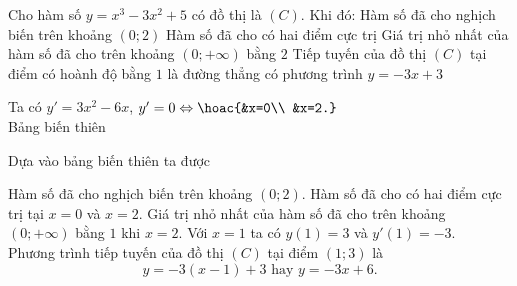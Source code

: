 \begin{ex}%
	Cho hàm số $y=x^3-3x^2+5$ có đồ thị là $(C)$. Khi đó:
	\choiceTF
	{\True Hàm số đã cho nghịch biến trên khoảng $(0;2)$}
	{\True Hàm số đã cho có hai điểm cực trị}
	{Giá trị nhỏ nhất của hàm số đã cho trên khoảng $(0;+\infty)$ bằng $2$}
	{Tiếp tuyến của đồ thị $(C)$ tại điểm có hoành độ bằng $1$ là đường thẳng có phương trình $y=-3x+3$}
	\loigiai
	{
		Ta có $y'=3x^2-6x$, $y'=0 \Leftrightarrow \hoac{&x=0\\ &x=2.}$\\
		Bảng biến thiên
		\begin{center}
		\end{center}
		Dựa vào bảng biến thiên ta được
		\begin{itemchoice}
			\itemch Hàm số đã cho nghịch biến trên khoảng $(0; 2)$.
			\itemch Hàm số đã cho có hai điểm cực trị tại $x=0$ và $x=2$.
			\itemch Giá trị nhỏ nhất của hàm số đã cho trên khoảng $(0; +\infty)$ bằng $1$ khi $x=2$.
			\itemch Với $x=1$ ta có $y(1)=3$ và $y'(1)=-3$.\\
			Phương trình tiếp tuyến của đồ thị $(C)$ tại điểm $(1;3)$ là
			\[
			y=-3(x-1)+3 \text{ hay } y=-3x+6.
			\]
		\end{itemchoice}
	}
\end{ex}

